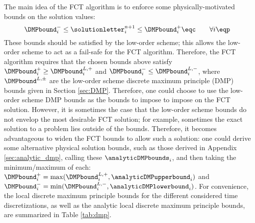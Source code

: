 The main idea of the FCT algorithm is to enforce some physically-motivated
bounds on the solution values:
\begin{equation}
  \DMPbound^{-}_i \leq \solutionletter_i^{n+1} \leq \DMPbound^{+}_i \eqc
  \qquad \forall i \eqp
\end{equation}
These bounds should be satisfied by the low-order scheme; this allows the
low-order scheme to act as a fail-safe for the FCT algorithm. Therefore,
the FCT algorithm requires that the chosen bounds above satisfy
$\DMPbound^{+}_i \geq \DMPbound^{L,+}_i$ and
$\DMPbound^{-}_i \leq \DMPbound^{L,-}_i$, where $\DMPbound^{L,\pm}$
are the low-order scheme discrete maximum principle (DMP) bounds given in
Section \ref{sec:DMP}. Therefore, one could choose to use the
low-order scheme DMP bounds as the bounds to impose to impose on the
FCT solution. However, it is sometimes the case that the low-order scheme
bounds do not envelop the most desirable FCT solution; for example, sometimes
the exact solution to a problem lies outside of the bounds. Therefore, it
becomes advantageous to widen the FCT bounds to allow such a solution:
one could derive some alternative physical
solution bounds, such as those derived in Appendix \ref{sec:analytic_dmp},
calling these $\analyticDMPbounds_i$, and then taking the minimum/maximum of
each: $\DMPbound^{+}_i = \max(\DMPbound^{L,+}_i,\analyticDMPupperbound_i)$ and
$\DMPbound^{-}_i = \min(\DMPbound^{L,-}_i,\analyticDMPlowerbound_i)$.
For convenience, the local discrete maximum principle bounds for the
different considered time discretizations, as well as the analytic local
discrete maximum principle bounds, are summarized in Table \ref{tab:dmp}.

